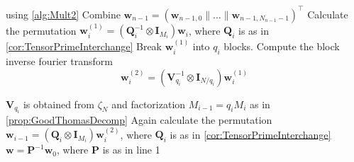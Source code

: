 \begin{algorithm}[ht]
\begin{algorithmic}[1]
            using \cref{alg:Mult2} 
        \EndFor
        \State Combine \(\bm{w}_{n-1} = (\bm{w}_{n-1, 0} \parallel \ldots \parallel \bm{w}_{n-1, N_{n-1} - 1})^{\top}\)
            \State Calculate the permutation \(\bm{w}_i^{(1)} = \left(\bm{Q}_i^{-1} \otimes \bm{I}_{M_i}\right) \bm{w}_i\), where \(\bm{Q}_i\) is as in \cref{cor:TensorPrimeInterchange}
            \State Break \(\bm{w}_i^{(1)}\) into \(q_i\) blocks. Compute the block inverse fourier transform
            \[\bm{w}_i^{(2)} = \left(\bm{V}_{q_i}^{-1} \otimes \bm{I}_{N/q_i}\right) \bm{w}_i^{(1)}\]

            \(\bm{V}_{q_i}\) is obtained from \(\zeta_N\) and factorization \(M_{i-1} = q_i M_i\) as in \cref{prop:GoodThomasDecomp}
            \State Again calculate the permutation \(\bm{w}_{i-1} = \left(\bm{Q}_i \otimes \bm{I}_{M_i}\right) \bm{w}_i^{(2)}\), where \(\bm{Q}_i\) is as in \cref{cor:TensorPrimeInterchange}
        \EndFor
         \(\bm{w} = \bm{P}^{-1} \bm{w}_0\), where \(\bm{P}\) is as in line 1
    \end{algorithmic}
\end{algorithm}